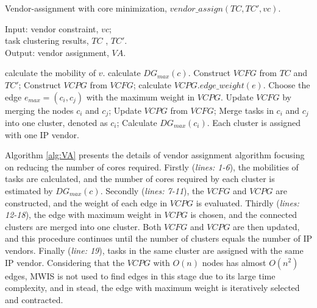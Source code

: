 \documentclass[10pt,journal]{IEEEtran}
\begin{document}
\begin{algorithm}[!h]
\caption{Vendor-assignment with core minimization, $vendor\_assign(TC, TC', vc)$.}
\label{alg:VA}
{Input:}
vendor constraint, $vc$; \\
\hspace*{2.8em}task clustering results, $TC$ , $TC'$.\\
{Output:} vendor assignment, $VA$.
\begin{algorithmic}[1]
    \STATE calculate the mobility of $v$.
\ENDFOR
{}
    \STATE calculate $DG_{max}(c)$.
\ENDFOR
\STATE Construct $VCFG$ from $TC$ and $TC'$;
\STATE Construct $VCPG$ from $VCFG$;
    \STATE calculate $VCPG.edge\_weight(e)$.
\ENDFOR
{}
\STATE Choose the edge $e_{max}=(c_i,c_j)$ with the maximum weight in $VCPG$.
\STATE Update $VCFG$ by merging the nodes $c_i$ and $c_j$;
\STATE Update $VCPG$ from $VCFG$;
\STATE Merge tasks in $c_i$ and $c_j$ into one cluster, denoted as $c_{i}$;
\STATE Calculate $DG_{max}(c_i)$.
\ENDWHILE
\STATE Each cluster is assigned with one IP vendor.
\end{algorithmic}
\end{algorithm}

Algorithm \ref{alg:VA} presents the details of vendor assignment algorithm focusing on reducing the number of cores required. Firstly (\textit{lines: 1-6}), the mobilities of tasks are calculated, and the number of cores required by each cluster is estimated by $DG_{max}(c)$. Secondly (\textit{lines: 7-11}), the $VCFG$ and $VCPG$ are constructed, and the weight of each edge in $VCPG$ is evaluated. Thirdly (\textit{lines: 12-18}), the edge with maximum weight in $VCPG$ is chosen, and the connected clusters are merged into one cluster. Both $VCFG$ and $VCPG$ are then updated, and this procedure continues until the number of clusters equals the number of IP vendors. Finally (\textit{line: 19}), tasks in the same cluster are assigned with the same IP vendor. Considering that the $VCPG$ with $O(n)$ nodes has almost $O(n^2)$ edges, MWIS is not used to find edges in this stage due to its large time complexity, and in stead, the edge with maximum weight is iteratively selected and contracted.
\end{document}
